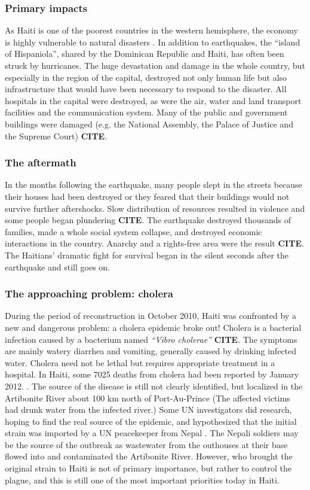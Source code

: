 \documentclass[11pt]{article}
\begin{document}
\subsubsection*{Primary impacts}
As Haiti is one of the poorest countries in the western hemisphere,  the economy is highly vulnerable to natural disasters \cite{web:unicef}. In addition to earthquakes, the “island of Hispaniola”, shared by the Dominican Republic and Haiti, has often been struck by hurricanes. The huge devastation and damage in the whole country, but especially in the region of the capital, destroyed not only human life but also infrastructure that would have been necessary to respond to the disaster. All hospitals in the capital were destroyed, as were the air, water and land transport facilities and the communication system. Many of the public and government buildings were damaged (e.g. the National Assembly, the Palace of Justice and the Supreme Court) \textbf{CITE}.


\subsubsection*{The aftermath}

In the months following the earthquake, many people slept in the streets because their houses had been destroyed or they feared that their buildings would not survive further aftershocks. Slow distribution of resources resulted in violence and some people began plundering \textbf{CITE}. The earthquake destroyed thousands of families, made a whole social system collapse, and destroyed economic interactions in the country. Anarchy and a rights-free area were the result \textbf{CITE}. The Haitians' dramatic fight for survival began in the silent seconds after the earthquake and still goes on.


\subsubsection*{The approaching problem: cholera}
During the period of reconstruction in October 2010, Haiti was confronted by a new and dangerous problem: a cholera epidemic broke out! Cholera is a bacterial infection caused by a bacterium named \textit{“Vibro cholerae”} \textbf{CITE}. The symptoms are mainly watery diarrhea and vomiting, generally caused by drinking infected water. Cholera need not be lethal but requires appropriate treatment in a hospital. In Haiti, some 7025 deaths from cholera had been reported by January 2012. \cite{web:MSPP}.
The source of the disease is still not clearly identified, but localized in the Artibonite River about 100 km north of Port-Au-Prince (The affected victims had drunk water from the infected river.) Some UN investigators did research, hoping to find the real source of the epidemic, and hypothesized that the initial strain was imported by a UN peacekeeper from Nepal \cite{web:alj}. The Nepali soldiers may be the source of the outbreak as wastewater from the outhouses at their base flowed into and contaminated the Artibonite River. However, who brought the original strain to Haiti is not of primary importance, but rather to control the plague, and this is still one of the most important priorities today in Haiti.
\end{document}
